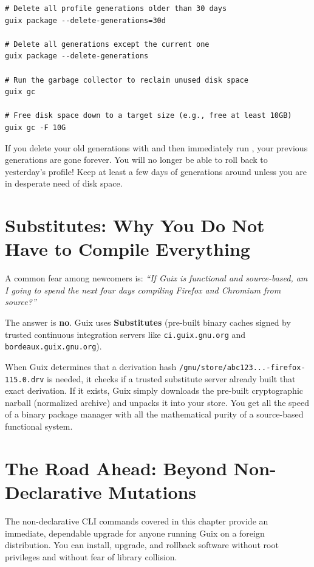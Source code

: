 \begin{lstlisting}[style=guixcli]
# Delete all profile generations older than 30 days
guix package --delete-generations=30d

# Delete all generations except the current one
guix package --delete-generations

# Run the garbage collector to reclaim unused disk space
guix gc

# Free disk space down to a target size (e.g., free at least 10GB)
guix gc -F 10G
\end{lstlisting}

\begin{footgunbox}
If you delete your old generations with  and then immediately run , your previous generations are gone forever. You will no longer be able to roll back to yesterday's profile! Keep at least a few days of generations around unless you are in desperate need of disk space.
\end{footgunbox}

\section{Substitutes: Why You Do Not Have to Compile Everything}

A common fear among newcomers is: \emph{``If Guix is functional and source-based, am I going to spend the next four days compiling Firefox and Chromium from source?''}

The answer is \textbf{no}. Guix uses \textbf{Substitutes} (pre-built binary caches signed by trusted continuous integration servers like \texttt{ci.guix.gnu.org} and \texttt{bordeaux.guix.gnu.org}).

When Guix determines that a derivation hash \texttt{/gnu/store/abc123...-firefox-115.0.drv} is needed, it checks if a trusted substitute server already built that exact derivation. If it exists, Guix simply downloads the pre-built cryptographic narball (normalized archive) and unpacks it into your store. You get all the speed of a binary package manager with all the mathematical purity of a source-based functional system.

\section{The Road Ahead: Beyond Non-Declarative Mutations}

The non-declarative CLI commands covered in this chapter provide an immediate, dependable upgrade for anyone running Guix on a foreign distribution. You can install, upgrade, and rollback software without root privileges and without fear of library collision.

